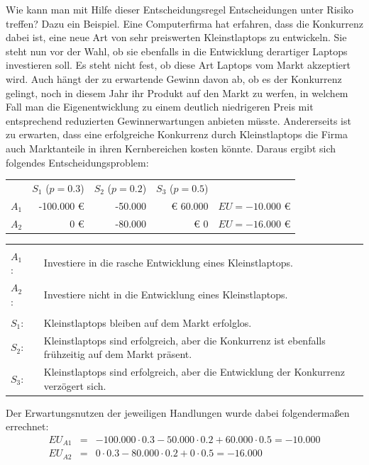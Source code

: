 Wie kann man mit Hilfe dieser Entscheidungsregel Entscheidungen unter Risiko
treffen? Dazu ein Beispiel.\label{RisikoBeispiel1} Eine Computerfirma hat
erfahren, dass die Konkurrenz dabei ist, eine neue Art von sehr preiswerten 
Kleinstlaptops zu
entwickeln. Sie steht nun vor der Wahl, ob sie ebenfalls in die Entwicklung
derartiger Laptops investieren soll. Es steht nicht fest, ob diese Art Laptops
vom Markt akzeptiert wird. Auch hängt der zu erwartende Gewinn davon ab, ob es
der Konkurrenz gelingt, noch in diesem Jahr ihr Produkt auf den Markt zu
werfen, in welchem Fall man die Eigenentwicklung zu einem deutlich niedrigeren
Preis mit entsprechend reduzierten Gewinnerwartungen anbieten müsste.
Andererseits ist zu erwarten, dass eine erfolgreiche Konkurrenz durch
Kleinstlaptops die Firma auch Marktanteile in ihren Kernbereichen kosten könnte.
Daraus ergibt sich folgendes Entscheidungsproblem:
\begin{center}
\begin{tabular}{c|r|r|r|r}
\multicolumn{1}{c}{}  & \multicolumn{1}{c}{$S_1$ ($p=0.3$)}  &
\multicolumn{1}{c}{$S_2$ ($p=0.2$)} & \multicolumn{1}{c}{$S_3$ ($p=0.5$)} & 
\multicolumn{1}{c}{} \\
\cline{2-4} $A_1$ & -100.000 € & -50.000 & € 60.000 & $EU = -10.000$ €\\ 
\cline{2-4} $A_2$ & 0 €        & -80.000 & € 0      & $EU = -16.000$ €\\ 
\cline{2-4}
\end{tabular}
\begin{tabular}{llp{11.5cm}}
& & \\
$A_1$: & & Investiere in die rasche Entwicklung eines Kleinstlaptops.\\
$A_2$: & & Investiere nicht in die Entwicklung eines Kleinstlaptops.\\
& &\\
$S_1$: & & Kleinstlaptops bleiben auf dem Markt erfolglos.\\
$S_2$: & & Kleinstlaptops sind erfolgreich, aber die Konkurrenz
                   ist ebenfalls frühzeitig auf dem Markt präsent.\\
$S_3$: & & Kleinstlaptops sind erfolgreich, aber die Entwicklung 
                   der Kon\-kurrenz verzögert sich. \\
\end{tabular}
\end{center}
Der Erwartungsnutzen der jeweiligen Handlungen wurde dabei folgendermaßen
errechnet:
\begin{eqnarray*}
EU_{A1} & = & -100.000 \cdot 0.3 - 50.000 \cdot 0.2 + 60.000 \cdot 0.5 =
-10.000 \\ 
EU_{A2} & = & 0 \cdot 0.3 - 80.000 \cdot 0.2 + 0 \cdot 0.5 = -16.000
\\
\end{eqnarray*}

